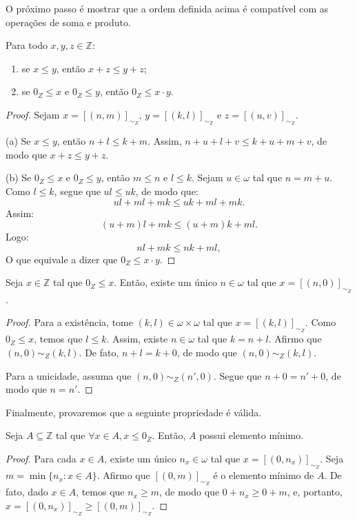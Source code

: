 O próximo passo é mostrar que a ordem definida acima é compatível com as operações de soma e produto.
\begin{proposition}
    Para todo $x, y, z \in \mathbb Z$:
    \begin{enumerate}[label=(\alph*)]
        \item se $x\leq y$, então $x+z\leq y+z$;
        \item se $0_Z\leq x$ e $0_Z\leq y$, então $0_Z\leq x\cdot y$.
    \end{enumerate}
\end{proposition}
\begin{proof}Sejam $x=[(n, m)]_{\sim_Z}$, $y=[(k, l)]_{\sim_Z}$ e $z=[(u, v)]_{\sim_Z}$.

    (a) Se $x\leq y$, então $n+l\leq k+m$.
    Assim, $n+u+l+v\leq k+u+m+v$, de modo que $x+z\leq y+z$.

    (b) Se $0_Z\leq x$ e $0_Z\leq y$, então $m\leq n$ e $l\leq k$.
    Sejam $u\in \omega$ tal que $n=m+u$.
    Como $l\leq k$, segue que $ul\leq uk$, de modo que:
    \[
        ul+ml+mk\leq uk+ml+mk.
    \]
    Assim:
    \[
        (u+m)l+mk\leq (u+m)k+ml.
    \]
    Logo:
    \[
        nl+mk\leq nk+ml,
    \]
    O que equivale a dizer que $0_Z\leq x\cdot y$.
\end{proof}

\begin{lemma}
    Seja $x\in \mathbb Z$ tal que $0_Z\leq x$.
    Então, existe um único $n\in \omega$ tal que $x=[(n, 0)]_{\sim_Z}$.
\end{lemma}
\begin{proof}
    Para a existência, tome $(k, l)\in \omega\times \omega$ tal que $x=[(k, l)]_{\sim_Z}$.
    Como $0_Z\leq x$, temos que $l\leq k$.
    Assim, existe $n\in \omega$ tal que $k=n+l$.
    Afirmo que $(n, 0)\sim_Z (k, l)$.
    De fato, $n+l=k+0$, de modo que $(n, 0)\sim_Z (k, l)$.

    Para a unicidade, assuma que $(n, 0)\sim_Z (n', 0)$.
    Segue que $n+0=n'+0$, de modo que $n=n'$.
\end{proof}

Finalmente, provaremos que a seguinte propriedade é válida.

\begin{proposition}
    Seja $A\subseteq \mathbb Z$ tal que $\forall x \in A, x\leq 0_Z$.
    Então, $A$ possui elemento mínimo.
\end{proposition}
\begin{proof}
    Para cada $x\in A$, existe um único $n_x\in \omega$ tal que $x=[(0, n_x)]_{\sim_Z}$.
    Seja $m=\min\{n_x: x\in A\}$.
    Afirmo que $[(0, m)]_{\sim_Z}$ é o elemento mínimo de $A$.
    De fato, dado $x\in A$, temos que $n_x\geq m$, de modo que $0+n_x\geq 0+m$, e, portanto, $x=[(0, n_x)]_{\sim_Z}\geq [(0, m)]_{\sim_Z}$.
\end{proof}


